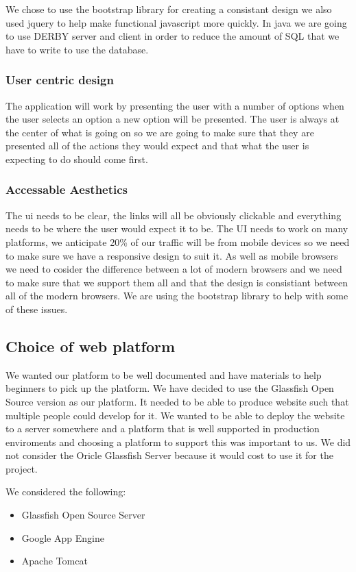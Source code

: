 \documentclass{article}
\begin{document}
We chose to use the bootstrap library for creating a consistant design we also used jquery to help make functional javascript more quickly. In java we are going to use DERBY server and client in order to reduce the amount of SQL that we have to write to use the database.

\subsubsection{User centric design}
The application will work by presenting the user with a number of options when the user selects an option a new option will be presented. The user is always at the center of what is going on so we are going to make sure that they are presented all of the actions they would expect and that what the user is expecting to do should come first.

\subsubsection{Accessable Aesthetics}
The ui needs to be clear, the links will all be obviously clickable and everything needs to be where the user would expect it to be. The UI needs to work on many platforms, we anticipate 20\% of our traffic will be from mobile devices so we need to make sure we have a responsive design to suit it. As well as mobile browsers we need to cosider the difference between a lot of modern browsers and we need to make sure that we support them all and that the design is consistiant between all of the modern browsers. We are using the bootstrap library to help with some of these issues. 

\subsection{Choice of web platform}
We wanted our platform to be well documented and have materials to help beginners to pick up the platform. We have decided to use the Glassfish Open Source version as our platform. It needed to be able to produce website such that multiple people could develop for it. We wanted to be able to deploy the website to a server somewhere and a platform that is well supported in production enviroments and choosing a platform to support this was important to us.
We did not consider the Oricle Glassfish Server because it would cost to use it for the project.

We considered the following:
\begin{itemize}
	\item{Glassfish Open Source Server}
	\item{Google App Engine}
	\item{Apache Tomcat}
\end{itemize}
\end{document}
